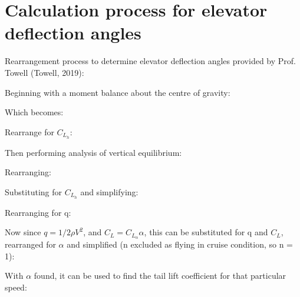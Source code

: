 \documentclass[../main.tex]{subfiles}
\begin{document}
\section{Calculation process for elevator deflection angles} \label{appendix:elevator-deflection}

Rearrangement process to determine elevator deflection angles provided by Prof. Towell (Towell, 2019):

Beginning with a moment balance about the centre of gravity:


Which becomes:
	
	
Rearrange for $C_{L_h}$:

	
Then performing analysis of vertical equilibrium:

	
Rearranging: 

	
Substituting for $C_{L_h}$ and simplifying:


Rearranging for q:

	
Now since $q=1/2\rho V^2$, and $C_L=C_{L_\alpha}  \alpha$, this can be substituted for q and $C_L$, rearranged for $\alpha$ and simplified (n excluded as flying in cruise condition, so n = 1):


With $\alpha$ found, it can be used to find the tail lift coefficient for that particular speed:


	   	
\end{document}
